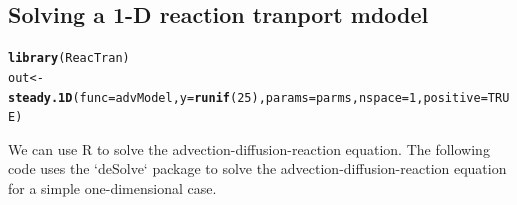 \documentclass{tufte-handout}\usepackage[]{graphicx}\usepackage[]{xcolor}
\makeatletter
\newcommand{\hlnum}[1]{\textcolor[rgb]{0.686,0.059,0.569}{#1}}%
\newcommand{\hlstd}[1]{\textcolor[rgb]{0.345,0.345,0.345}{#1}}%
\newcommand{\hlkwb}[1]{\textcolor[rgb]{0.69,0.353,0.396}{#1}}%
\newcommand{\hlkwc}[1]{\textcolor[rgb]{0.333,0.667,0.333}{#1}}%
\newcommand{\hlkwd}[1]{\textcolor[rgb]{0.737,0.353,0.396}{\textbf{#1}}}%
\newenvironment{kframe}{%
 \def\at@end@of@kframe{}%
 \ifinner\ifhmode%
  \def\at@end@of@kframe{\end{minipage}}%
  \begin{minipage}{\columnwidth}%
 \fi\fi%
 \def\FrameCommand##1{\hskip\@totalleftmargin \hskip-\fboxsep
 \colorbox{shadecolor}{##1}\hskip-\fboxsep
     \hskip-\linewidth \hskip-\@totalleftmargin \hskip\columnwidth}%
 \MakeFramed {\advance\hsize-\width
   \@totalleftmargin\z@ \linewidth\hsize
   \@setminipage}}%
 {\par\unskip\endMakeFramed%
 \at@end@of@kframe}
\newenvironment{knitrout}{}{} %
\makeatother
\begin{document}
\subsection{Solving a 1-D reaction tranport mdodel}

\begin{knitrout}
\color{fgcolor}\begin{kframe}
\begin{alltt}
\hlkwd{library}\hlstd{(ReacTran)}
\hlstd{out} \hlkwb{<-} \hlkwd{steady.1D}\hlstd{(}\hlkwc{func} \hlstd{= advModel,} \hlkwc{y} \hlstd{=} \hlkwd{runif}\hlstd{(}\hlnum{25}\hlstd{),} \hlkwc{params} \hlstd{= parms,} \hlkwc{nspace}\hlstd{=} \hlnum{1}\hlstd{,} \hlkwc{positive} \hlstd{=} \hlnum{TRUE}\hlstd{)}
\end{alltt}
\end{kframe}
\end{knitrout}

We can use R to solve the advection-diffusion-reaction equation. The following code uses the `deSolve` package to solve the advection-diffusion-reaction equation for a simple one-dimensional case.
\end{document}
